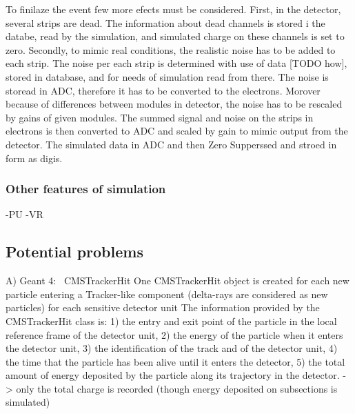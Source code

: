 To finilaze the event few more efects must be considered. First, in the detector, several strips are dead. The information about dead channels is stored i  the databe, read by the simulation, and simulated charge on these channels is set to zero. Secondly, to mimic real conditions, the realistic noise has to be added to each strip. The noise per each strip is determined with use of data [TODO how], stored in database, and for needs of simulation read from there. The noise is storead in ADC, therefore it has to be converted to the electrons. Morover because of differences between modules in detector, the noise has to be rescaled by gains of given modules. The summed signal and noise on the strips in electrons is then converted to ADC and scaled by gain to mimic output from the detector. The simulated data in ADC and then Zero Supperssed and stroed in form as digis. 
 
 

\subsubsection{Other features of simulation}
-PU
-VR

\subsection{Potential problems}
A) Geant 4:~\cite{Lefebure:1364020}
CMSTrackerHit
One CMSTrackerHit object is created
for each new particle entering a Tracker-like component (delta-rays are considered as new particles)
for each sensitive detector unit
The information provided by the CMSTrackerHit class is:
1) the entry and exit point of the particle in the local reference frame of the detector unit,
2) the energy of the particle when it enters the detector unit,
3) the identification of the track and of the detector unit,
4) the time that the particle has been alive until it enters the detector,
5) the total amount of energy deposited by the particle along its trajectory in the detector.
-> only the total charge is recorded  (though energy deposited on subsections is simulated)

